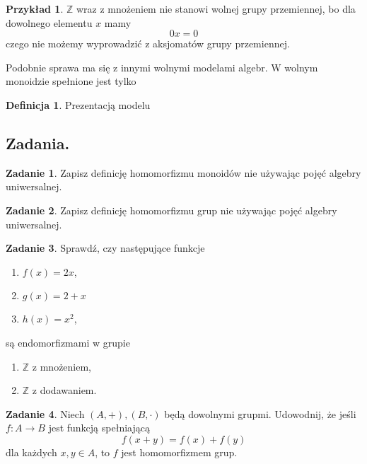 \documentclass{article}
\theoremstyle{definition}
\newtheorem{definition}{Definicja}[section]
\newtheorem{example}{Przykład}[section]
\newtheorem{exercise}{Zadanie}[section]
\begin{document}
\begin{example}
	$\mathbb{Z}$ wraz z mnożeniem nie stanowi wolnej grupy przemiennej,
		bo dla dowolnego elementu $x$ mamy
		\begin{equation}
		0x = 0
		\end{equation}
		czego nie możemy wyprowadzić z aksjomatów grupy przemiennej.
\end{example}

Podobnie sprawa ma się z innymi wolnymi modelami algebr.
W wolnym monoidzie spełnione jest tylko
	

\begin{definition}
    Prezentacją modelu
\end{definition}

\subsection{Zadania.}

\begin{exercise}
	Zapisz definicję homomorfizmu monoidów nie używając pojęć algebry uniwersalnej.
\end{exercise}

\begin{exercise}
	Zapisz definicję homomorfizmu grup nie używając pojęć algebry uniwersalnej.
\end{exercise}

\begin{exercise}
	Sprawdź, czy następujące funkcje
	\begin{enumerate}
		\item $f(x) = 2x$,
		\item $g(x) = 2 + x$
		\item $h(x) = x^2$,
	\end{enumerate}
	są endomorfizmami w grupie
	\begin{enumerate}
		\item $\mathbb{Z}$ z mnożeniem,
		\item $\mathbb{Z}$ z dodawaniem.
	\end{enumerate}
\end{exercise}

\begin{exercise}
	Niech $(A, +), (B, \cdot)$ będą dowolnymi grupmi.
	Udowodnij,
		że jeśli $f: A \to B$ jest funkcją spełniającą
	\begin{equation}
		f(x + y) = f(x) + f(y)
	\end{equation}
	dla każdych $x, y \in A$, to $f$ jest homomorfizmem grup.
\end{exercise}
\end{document}
